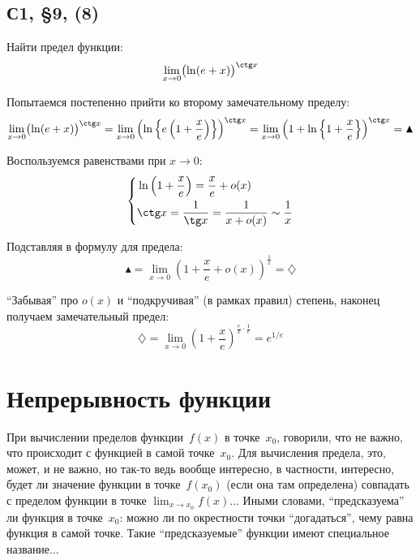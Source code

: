 \documentclass[a4paper,12pt]{article}
\begin{document}
  \subsection{С1, \S 9, (8)}

  Найти предел функции:
  \[
    \lim_{x \to 0} \bigl(\ln(e + x)\bigr)^{\ctg x}
  \]
  
  \begin{solution}
    Попытаемся постепенно прийти ко второму замечательному пределу:
    \[
      \lim_{x \to 0} \bigl(\ln(e + x)\bigr)^{\ctg x}
        = \lim_{x \to 0} \left(\ln\left\{ e \left(1 + \frac{x}{e}\right) \right\}\right)^{\ctg x}
        = \lim_{x \to 0} \left(1 + \ln\left\{1 + \frac{x}{e}\right\}\right)^{\ctg x}
        = \blacktriangle
    \]

    Воспользуемся равенствами при $x \to 0$:
    \[
      \left\{
        \begin{aligned}
          &\ln\left(1 + \frac{x}{e}\right) = \frac{x}{e} + o(x)\\
          &\ctg x = \frac{1}{\tg x} = \frac{1}{x + o(x)} \sim \frac{1}{x}
        \end{aligned}
      \right.
    \]

    Подставляя в формулу для предела:
    \[
      \blacktriangle = \lim_{x \to 0} \left(1 + \frac{x}{e} + o(x)\right)^{\frac{1}{x}} = \diamondsuit
    \]

    ``Забывая'' про $o(x)$ и ``подкручивая'' (в рамках правил) степень, наконец получаем замечательный предел:
    \[
      \diamondsuit = \lim_{x \to 0} \left(1 + \frac{x}{e}\right)^{\frac{e}{x} \cdot \frac{1}{e}}
        = e^{1/e}
    \]
  \end{solution}
 

  \section{Непрерывность функции}


  При вычислении пределов функции~$f(x)$ в точке~$x_0$, говорили, что не важно, что происходит с функцией в самой точке~$x_0$.
  Для вычисления предела, это, может, и не важно, но так-то ведь вообще интересно, в частности, интересно, будет ли значение функции в точке~$f(x_0)$ (если она там определена) совпадать с пределом функции в точке $\lim_{x \to x_0} f(x)$...
  Иными словами, ``предсказуема'' ли функция в точке~$x_0$: можно ли по окрестности точки ``догадаться'', чему равна функция в самой точке.
  Такие ``предсказуемые'' функции имеют специальное название...
  
\end{document}

